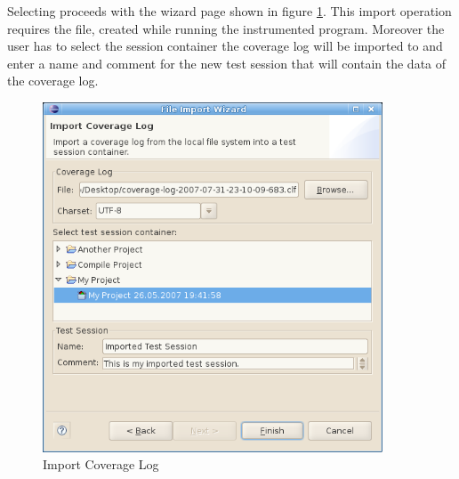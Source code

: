 \par
Selecting  proceeds with the wizard page shown in figure \ref{ui_fg:Import Coverage Log}. This import operation requires the  file, created while running the instrumented program. Moreover the user has to select the session container the coverage log will be imported to and enter a name and comment for the new test session that will contain the data of the coverage log.
\begin{figure}[hbtp]
 \centering
 \includegraphics[width=0.9\textwidth]{images/Test_Case_Administration_View/Import_Coverage_Log.png}
 \caption{Import Coverage Log}
 \label{ui_fg:Import Coverage Log}
\end{figure}
\par

